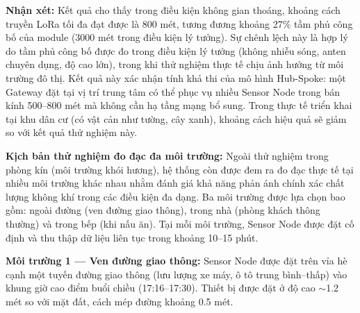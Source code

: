 \documentclass[../DoAn.tex]{subfiles}
\begin{document}

\textbf{Nhận xét:} Kết quả cho thấy trong điều kiện không gian thoáng, khoảng cách truyền LoRa tối đa đạt được là 800 mét, tương đương khoảng 27\% tầm phủ công bố của module (3000 mét trong điều kiện lý tưởng). Sự chênh lệch này là hợp lý do tầm phủ công bố được đo trong điều kiện lý tưởng (không nhiễu sóng, anten chuyên dụng, độ cao lớn), trong khi thử nghiệm thực tế chịu ảnh hưởng từ môi trường đô thị. Kết quả này xác nhận tính khả thi của mô hình Hub-Spoke: một Gateway đặt tại vị trí trung tâm có thể phục vụ nhiều Sensor Node trong bán kính 500--800 mét mà không cần hạ tầng mạng bổ sung. Trong thực tế triển khai tại khu dân cư (có vật cản như tường, cây xanh), khoảng cách hiệu quả sẽ giảm so với kết quả thử nghiệm này.

\textbf{Kịch bản thử nghiệm đo đạc đa môi trường:} Ngoài thử nghiệm trong phòng kín (môi trường khói hương), hệ thống còn được đem ra đo đạc thực tế tại nhiều môi trường khác nhau nhằm đánh giá khả năng phản ánh chính xác chất lượng không khí trong các điều kiện đa dạng. Ba môi trường được lựa chọn bao gồm: ngoài đường (ven đường giao thông), trong nhà (phòng khách thông thường) và trong bếp (khi nấu ăn). Tại mỗi môi trường, Sensor Node được đặt cố định và thu thập dữ liệu liên tục trong khoảng 10--15 phút.

\textbf{Môi trường 1 — Ven đường giao thông:} Sensor Node được đặt trên vỉa hè cạnh một tuyến đường giao thông (lưu lượng xe máy, ô tô trung bình--thấp) vào khung giờ cao điểm buổi chiều (17:16--17:30). Thiết bị được đặt ở độ cao $\sim$1.2 mét so với mặt đất, cách mép đường khoảng 0.5 mét.
\end{document}
